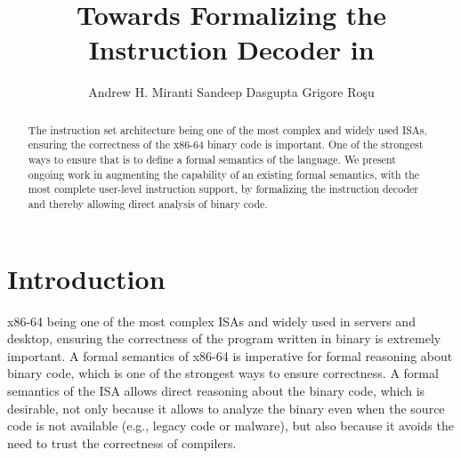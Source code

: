 \documentclass[a4paper,UKenglish,cleveref, autoref]{lipics-v2019}
\title{Towards Formalizing the \ISA Instruction Decoder in \K} %
\author{\quad Andrew H. Miranti \qquad Sandeep Dasgupta \qquad Grigore Ro\c{s}u}{\hspace{3.5cm}\quad University of Illinois at Urbana Champaign, USA}{\quad\qquad\qquad\quad\qquad\qquad\qquad\qquad\{miranti2, sdasgup3, grosu\}@illinois.edu}{}{}
\begin{document}
\maketitle

\begin{abstract}
    The \ISA instruction set architecture being one of the
    most complex and widely used ISAs,  ensuring the correctness of the x86-64 binary code is
    important. One of the strongest ways to ensure that is to define a  formal semantics of the \ISA language. We present ongoing work in augmenting the capability of an existing \ISA formal semantics, with the most complete user-level instruction support, by formalizing the instruction decoder and thereby allowing direct analysis of binary code.
\end{abstract}

\section{Introduction}
\label{sec:intro}
x86-64 being one of the most complex ISAs and widely used in servers and
desktop, ensuring the correctness of the program written in binary is extremely
important. A formal semantics of x86-64 is imperative for formal reasoning
about binary code, which is  one of the strongest ways to ensure
correctness. A formal semantics of the ISA allows direct reasoning about the
binary code, which is desirable, not only because it allows to analyze the
binary even when the source code is not available (e.g., legacy code or
    malware), but also because it avoids the need to trust the correctness of
compilers.

%
\end{document}
